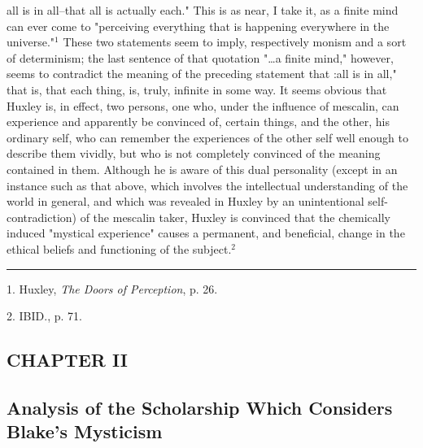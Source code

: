 \noindent all is in all--that all is actually each."
This is as near, I take it, as a finite mind can ever come to "perceiving everything that is
happening everywhere in the universe."$^{1}$ These two statements seem
to imply, respectively monism and a sort of determinism;
the last sentence of that quotation "\dots a finite mind," however,
seems to contradict the meaning of the preceding statement
that :all is in all," that is, that each thing, is,
truly, infinite in some way. It seems obvious that Huxley is, in
effect, two persons, one who, under the influence of mescalin, can
experience and apparently be convinced of, certain things, and
the other, his ordinary self, who can remember the experiences
of the other self well enough to describe them vividly, but who is not
completely convinced of the meaning contained in them. Although he is aware of
this dual personality (except in an instance such as that
above, which involves the intellectual understanding of the world in
general, and which was revealed in Huxley by an
unintentional self-contradiction) of the mescalin taker,
Huxley is convinced that the chemically induced "mystical experience" causes
a permanent, and beneficial, change in the ethical beliefs
and functioning of the subject.$^{2}$\par
\vspace*{\fill}
\noindent\rule{0.25\textwidth}{0.4pt}\par
1. Huxley, \textit{The Doors of Perception}, p. 26.\par
2. IBID., p. 71.\par

\newpage

\begin{center}
	\section[Chapter II: Analysis of the Scholarship Which Considers Blake's Mysticism]{CHAPTER II}
	\subsection*{Analysis of the Scholarship Which Considers\\Blake's Mysticism}
\end{center}


{}

{}

